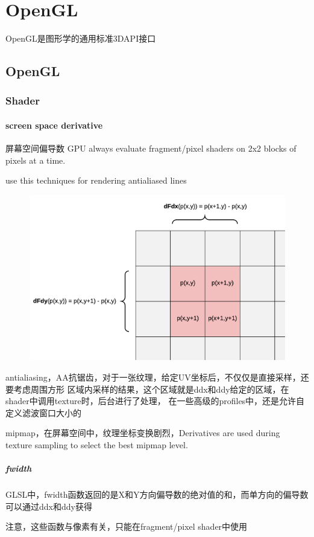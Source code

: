 \clearpage
\part{ OpenGL }

OpenGL是图形学的通用标准3DAPI接口

\chapter{OpenGL}

\section{Shader}

\subsection{screen space derivative}
屏幕空间偏导数
GPU always evaluate fragment/pixel shaders on 2x2 blocks of pixels at a time.

use this techniques for rendering antialiased lines

\begin{figure}[h]
    \centering
    \includegraphics[width=\textwidth]{images/Shader-Derivatives.png}
\end{figure}

antialiasing，AA抗锯齿，对于一张纹理，给定UV坐标后，不仅仅是直接采样，还要考虑周围方形
区域内采样的结果，这个区域就是ddx和ddy给定的区域，在shader中调用texture时，后台进行了处理，
在一些高级的profiles中，还是允许自定义滤波窗口大小的

mipmap，在屏幕空间中，纹理坐标变换剧烈，Derivatives are used during texture sampling to
select the best mipmap level.

\subsubsection{fwidth}
GLSL中，fwidth函数返回的是X和Y方向偏导数的绝对值的和，而单方向的偏导数可以通过ddx和ddy获得

注意，这些函数与像素有关，只能在fragment/pixel shader中使用